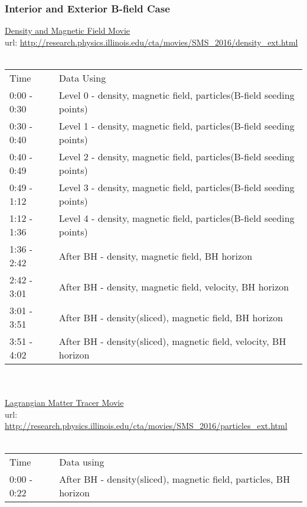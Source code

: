 \documentclass{article}
\begin{document}
\subsubsection{Interior and Exterior B-field Case} 

\underline{Density and Magnetic Field Movie} \\
url: \url{http://research.physics.illinois.edu/cta/movies/SMS_2016/density_ext.html} \\
\\
\begin{tabular}{l l}
Time		& Data Using \\
0:00 - 0:30	& Level 0 - density, magnetic field, particles(B-field seeding points) \\
0:30 - 0:40	& Level 1 - density, magnetic field, particles(B-field seeding points) \\
0:40 - 0:49	& Level 2 - density, magnetic field, particles(B-field seeding points) \\
0:49 - 1:12	& Level 3 - density, magnetic field, particles(B-field seeding points) \\
1:12 - 1:36	& Level 4 - density, magnetic field, particles(B-field seeding points) \\
1:36 - 2:42	& After BH - density, magnetic field, BH horizon \\
2:42 - 3:01	& After BH - density, magnetic field, velocity, BH horizon \\
3:01 - 3:51	& After BH - density(sliced), magnetic field, BH horizon \\
3:51 - 4:02	& After BH - density(sliced), magnetic field, velocity, BH horizon \\
\end{tabular}
\\
\\
\underline{Lagrangian Matter Tracer Movie} \\
url: \url{http://research.physics.illinois.edu/cta/movies/SMS_2016/particles_ext.html} \\
\\
\begin{tabular}{l l}
Time		& Data using \\
0:00 - 0:22	& After BH - density(sliced), magnetic field, particles, BH horizon \\
\end{tabular}



\end{document}

